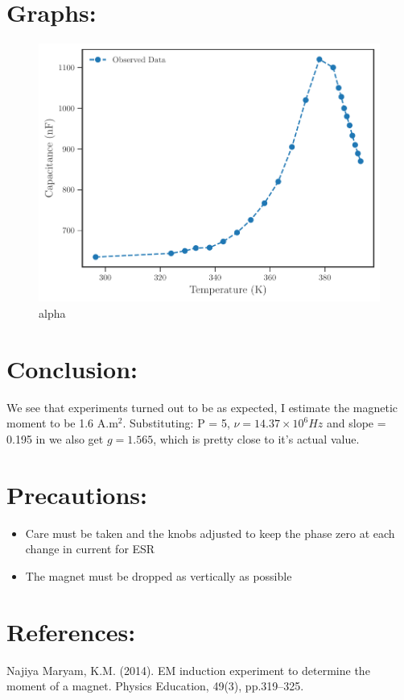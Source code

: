 \documentclass{../_layouts/ieeeconf}
\begin{document}
\section{Graphs:}
\begin{figure}[H]
\centering
\includegraphics[width = \columnwidth]{../_assets/Capacitance.pdf}
\caption{alpha}
\label{fig:"alpha"}
\end{figure}
\section{Conclusion:}
We see that experiments turned out to be as expected, I estimate the magnetic moment to be 1.6 A.m\(^2\). Substituting: P = 5, \(\nu = 14.37 \times 10^6 Hz\) and slope = 0.195 in we also get \(g = 1.565\), which is pretty close to it's actual value.
\section{Precautions:}
\begin{itemize}
\tightlist
\item
Care must be taken and the knobs adjusted to keep the phase zero at each change in current for ESR
\item
The magnet must be dropped as vertically as possible
\end{itemize}
\section{References:}
Najiya Maryam, K.M. (2014). EM induction experiment to determine the moment of a magnet. Physics Education, 49(3), pp.319--325.
\clearpage
\end{document}
